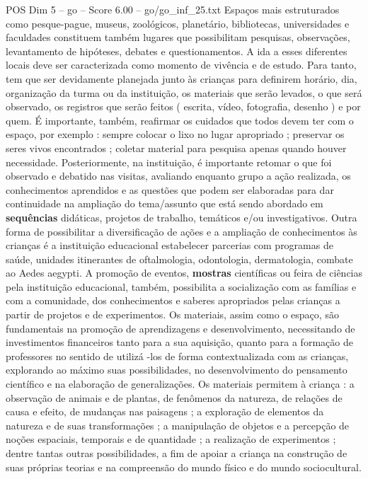 \begin{textsample}{POS Dim 5 – go – Score 6.00 – go/go\_inf\_25.txt}
Espaços mais estruturados como pesque-pague, museus, zoológicos, planetário, bibliotecas, universidades e faculdades constituem também lugares que possibilitam pesquisas, observações, levantamento de hipóteses, debates e questionamentos.
A ida a esses diferentes locais deve ser caracterizada como momento de vivência e de estudo.
Para tanto, tem que ser devidamente planejada junto às crianças para definirem horário, dia, organização da turma ou da instituição, os materiais que serão levados, o que será observado, os registros que serão feitos ( escrita, vídeo, fotografia, desenho ) e por quem.
É importante, também, reafirmar os cuidados que todos devem ter com o espaço, por exemplo : sempre colocar o lixo no lugar apropriado ; preservar os seres vivos encontrados ; coletar material para pesquisa apenas quando houver necessidade.
Posteriormente, na instituição, é importante retomar o que foi observado e debatido nas visitas, avaliando enquanto grupo a ação realizada, os conhecimentos aprendidos e as questões que podem ser elaboradas para dar continuidade na ampliação do tema/assunto que está sendo abordado em \textbf{sequências} didáticas, projetos de trabalho, temáticos e/ou investigativos.
Outra forma de possibilitar a diversificação de ações e a ampliação de conhecimentos às crianças é a instituição educacional estabelecer parcerias com programas de saúde, unidades itinerantes de oftalmologia, odontologia, dermatologia, combate ao Aedes aegypti.
A promoção de eventos, \textbf{mostras} científicas ou feira de ciências pela instituição educacional, também, possibilita a socialização com as famílias e com a comunidade, dos conhecimentos e saberes apropriados pelas crianças a partir de projetos e de experimentos.
Os materiais, assim como o espaço, são fundamentais na promoção de aprendizagens e desenvolvimento, necessitando de investimentos financeiros tanto para a sua aquisição, quanto para a formação de professores no sentido de utilizá -los de forma contextualizada com as crianças, explorando ao máximo suas possibilidades, no desenvolvimento do pensamento científico e na elaboração de generalizações.
Os materiais permitem à criança : a observação de animais e de plantas, de fenômenos da natureza, de relações de causa e efeito, de mudanças nas paisagens ; a exploração de elementos da natureza e de suas transformações ; a manipulação de objetos e a percepção de noções espaciais, temporais e de quantidade ; a realização de experimentos ; dentre tantas outras possibilidades, a fim de apoiar a criança na construção de suas próprias teorias e na compreensão do mundo físico e do mundo sociocultural.

\end{textsample}

